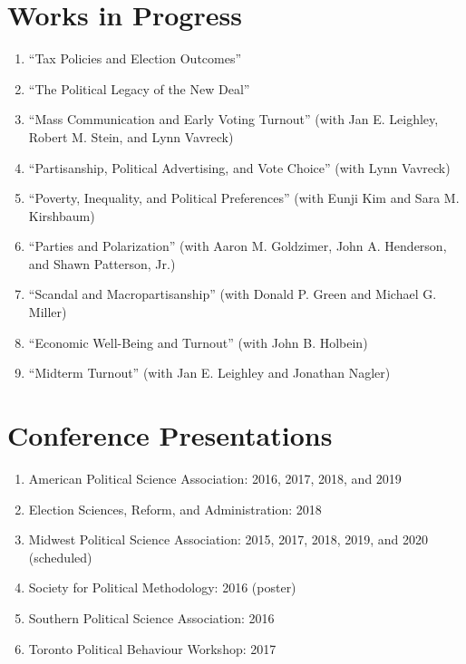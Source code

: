 \documentclass[12pt]{article}
\begin{document}
\section*{Works in Progress}

\begin{enumerate}[topsep = 0pt, itemsep = 1ex, partopsep  = 1ex, parsep = 1ex]

	\item[] ``Tax Policies and Election Outcomes''
	
	\item[] ``The Political Legacy of the New Deal''

	\item[] ``Mass Communication and Early Voting Turnout'' (with Jan E. Leighley, Robert M. Stein, and Lynn Vavreck)
	
	\item[] ``Partisanship, Political Advertising, and Vote Choice'' (with Lynn Vavreck) 
	
	\item[] ``Poverty, Inequality, and Political Preferences'' (with Eunji Kim and Sara M. Kirshbaum)
	
	\item[] ``Parties and Polarization'' (with Aaron M. Goldzimer, John A. Henderson, and Shawn Patterson, Jr.)
	
	\item[] ``Scandal and Macropartisanship'' (with Donald P. Green and Michael G. Miller)
	
	\item[] ``Economic Well-Being and Turnout'' (with John B. Holbein)
	
	\item[] ``Midterm Turnout'' (with Jan E. Leighley and Jonathan Nagler)

\end{enumerate}

\section*{Conference Presentations}

\begin{enumerate}[topsep = 0pt, itemsep = 1ex, partopsep  = 1ex, parsep = 1ex]
	
	\item[] American Political Science Association: 2016, 2017, 2018, and 2019
	
	\item[] Election Sciences, Reform, and Administration: 2018 
	
	\item[] Midwest Political Science Association: 2015, 2017, 2018, 2019, and 2020 (scheduled)
	
	\item[] Society for Political Methodology: 2016 (poster)
	
	\item[] Southern Political Science Association: 2016
	
	\item[] Toronto Political Behaviour Workshop: 2017
	
\end{enumerate}
\end{document}
